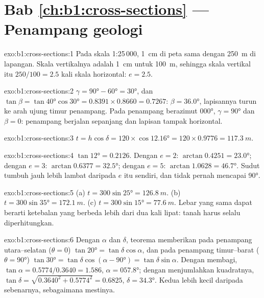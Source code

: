 \section*{Bab \ref{ch:b1:cross-sections} --- Penampang geologi}

\begin{solution}{exo:b1:cross-sections:1}
Pada skala 1:25\,000, \qty{1}{cm} di peta sama dengan \qty{250}{m} di lapangan. Skala vertikalnya adalah \qty{1}{cm} untuk \qty{100}{m}, sehingga skala vertikal itu $250/100 = 2.5$ kali skala horizontal: $e = 2.5$.
\end{solution}

\begin{solution}{exo:b1:cross-sections:2}
$\gamma = \ang{90} - \ang{60} = \ang{30}$, dan $\tan\beta = \tan\ang{40}
\cos\ang{30} = 0.8391\times0.8660 = 0.7267$: $\beta = \ang{36.0}$, lapisannya turun ke arah ujung timur penampang. Pada penampang berazimut
\ang{000}, $\gamma = \ang{90}$ dan $\beta = 0$: penampang berjalan sepanjang  dan lapisan tampak horizontal.
\end{solution}

\begin{solution}{exo:b1:cross-sections:3}
$t = h\cos\delta = 120\times\cos\ang{12.16} = 120\times0.9776 =
\qty{117.3}{m}$.
\end{solution}

\begin{solution}{exo:b1:cross-sections:4}
$\tan\ang{12} = 0.2126$. Dengan $e = 2$: $\arctan 0.4251 = \ang{23.0}$; dengan
$e = 3$: $\arctan 0.6377 = \ang{32.5}$; dengan $e = 5$: $\arctan 1.0628 =
\ang{46.7}$. Sudut tumbuh jauh lebih lambat daripada $e$ itu sendiri, dan tidak pernah mencapai
\ang{90}.
\end{solution}

\begin{solution}{exo:b1:cross-sections:5}
(a) $t = 300\sin\ang{25} = \qty{126.8}{m}$. (b) $t = 300\sin\ang{35} =
\qty{172.1}{m}$. (c) $t = 300\sin\ang{15} = \qty{77.6}{m}$. Lebar  yang sama dapat berarti ketebalan yang berbeda lebih dari dua kali lipat:  tanah harus selalu diperhitungkan.
\end{solution}

\begin{solution}{exo:b1:cross-sections:6}
Dengan  $\alpha$ dan  $\delta$, teorema memberikan pada penampang utara--selatan ($\theta = 0$) $\tan\ang{20} = \tan\delta\cos\alpha$,
dan pada penampang timur--barat ($\theta = \ang{90}$) $\tan\ang{30} =
\tan\delta\cos(\alpha - \ang{90}) = \tan\delta\sin\alpha$. Dengan membagi,
$\tan\alpha = 0.5774/0.3640 = 1.586$, $\alpha = \ang{057.8}$; dengan menjumlahkan kuadratnya, $\tan\delta = \sqrt{0.3640^2 + 0.5774^2} = 0.6825$, $\delta =
\ang{34.3}$. Kedua  lebih kecil daripada  sebenarnya, sebagaimana mestinya.
\end{solution}

